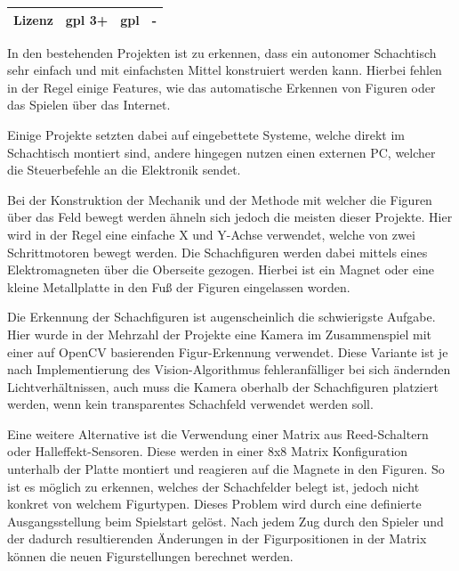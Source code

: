 \begin{longtable}[]{@{}llll@{}}
\begin{minipage}[t]{0.20\columnwidth}\raggedright
Lizenz\strut
\end{minipage} & \begin{minipage}[t]{0.24\columnwidth}\raggedright
\gls{gpl} 3+\strut
\end{minipage} & \begin{minipage}[t]{0.26\columnwidth}\raggedright
\gls{gpl}\strut
\end{minipage} & \begin{minipage}[t]{0.19\columnwidth}\raggedright
-\strut
\end{minipage}\tabularnewline
\bottomrule
\end{longtable}

In den bestehenden Projekten ist zu erkennen, dass ein autonomer
Schachtisch sehr einfach und mit einfachsten Mittel konstruiert werden
kann. Hierbei fehlen in der Regel einige Features, wie das automatische
Erkennen von Figuren oder das Spielen über das Internet.

Einige Projekte setzten dabei auf eingebettete Systeme, welche direkt im
Schachtisch montiert sind, andere hingegen nutzen einen externen PC,
welcher die Steuerbefehle an die Elektronik sendet.

Bei der Konstruktion der Mechanik und der Methode mit welcher die
Figuren über das Feld bewegt werden ähneln sich jedoch die meisten
dieser Projekte. Hier wird in der Regel eine einfache X und Y-Achse
verwendet, welche von zwei Schrittmotoren bewegt werden. Die
Schachfiguren werden dabei mittels eines Elektromagneten über die
Oberseite gezogen. Hierbei ist ein Magnet oder eine kleine Metallplatte
in den Fuß der Figuren eingelassen worden.

Die Erkennung der Schachfiguren ist augenscheinlich die schwierigste
Aufgabe. Hier wurde in der Mehrzahl der Projekte eine Kamera im
Zusammenspiel mit einer auf OpenCV basierenden Figur-Erkennung
verwendet. Diese Variante ist je nach Implementierung des
Vision-Algorithmus fehleranfälliger bei sich ändernden
Lichtverhältnissen, auch muss die Kamera oberhalb der Schachfiguren
platziert werden, wenn kein transparentes Schachfeld verwendet werden
soll.

Eine weitere Alternative ist die Verwendung einer Matrix aus
Reed-Schaltern oder Halleffekt-Sensoren. Diese werden in einer 8x8
Matrix Konfiguration unterhalb der Platte montiert und reagieren auf die
Magnete in den Figuren. So ist es möglich zu erkennen, welches der
Schachfelder belegt ist, jedoch nicht konkret von welchem Figurtypen.
Dieses Problem wird durch eine definierte Ausgangsstellung beim
Spielstart gelöst. Nach jedem Zug durch den Spieler und der dadurch
resultierenden Änderungen in der Figurpositionen in der Matrix können
die neuen Figurstellungen berechnet werden.

